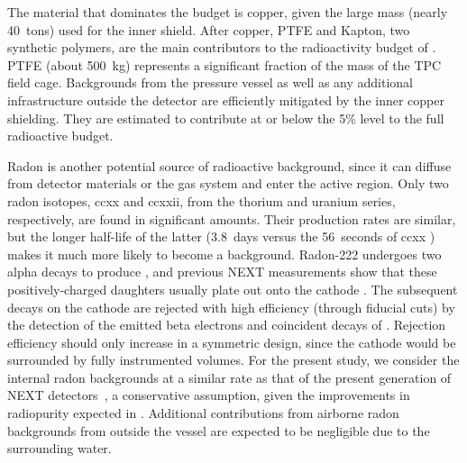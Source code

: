 The material that dominates the budget is copper, given the large mass (nearly 40~tons) used for the inner shield. 
After copper, PTFE and Kapton, two synthetic polymers, are the main contributors to the radioactivity budget of \NHD. PTFE (about \SI{500}{kg}) represents a significant fraction of the mass of the TPC field cage. Backgrounds from the pressure vessel as well as any additional infrastructure outside the detector are efficiently mitigated by the inner copper shielding. They are estimated to contribute at or below the 5\% level to the full radioactive budget. 



\indent

Radon is another potential source of radioactive background, since it can diffuse from detector materials or the gas system and enter the active region. Only two radon isotopes, \Rn{220} and \Rn{222}, from the thorium and uranium series, respectively, are found in significant amounts. Their production rates are similar, but the longer half-life of the latter (3.8~days versus the 56~seconds of \Rn{220} \cite{nudat}) makes it much more likely to become a background. Radon-222 undergoes two alpha decays to produce , and previous NEXT measurements show that these positively-charged daughters usually plate out onto the cathode \cite{Novella:2018ewv}. The subsequent  decays on the cathode are rejected with high efficiency (through fiducial cuts) by the detection of the emitted beta electrons and coincident decays of . Rejection efficiency should only increase in a symmetric design, since the cathode would be surrounded by fully instrumented volumes. For the present study, we consider the internal radon backgrounds at a similar rate as that of the present generation of NEXT detectors~\cite{Novella:2018ewv}, a conservative assumption, given the improvements in radiopurity expected in \NHD. Additional contributions from airborne radon backgrounds from outside the vessel are expected to be negligible due to the surrounding water.


